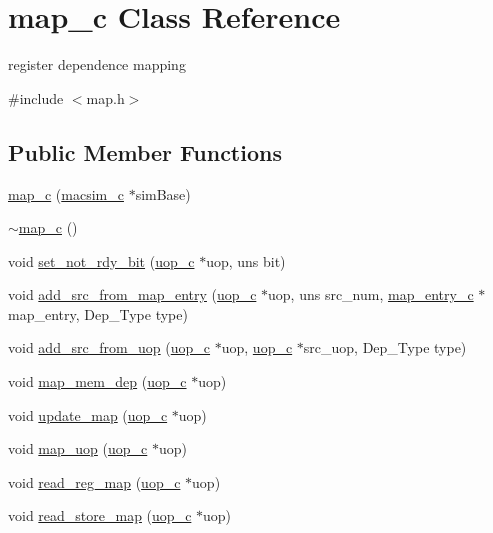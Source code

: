 \hypertarget{classmap__c}{
\section{map\_\-c Class Reference}
\label{classmap__c}
}


register dependence mapping  




{\ttfamily \#include $<$map.h$>$}

\subsection*{Public Member Functions}
\begin{DoxyCompactItemize}
\item 
\hyperlink{classmap__c_a5da8b3e64f7caac52a295a7e9b933f75}{map\_\-c} (\hyperlink{classmacsim__c}{macsim\_\-c} $\ast$simBase)
\item 
\hyperlink{classmap__c_a0ea194b2e9f7b55924fb542d78d8ca6f}{$\sim$map\_\-c} ()
\item 
void \hyperlink{classmap__c_a15ec904cf369a18d9b96954852783575}{set\_\-not\_\-rdy\_\-bit} (\hyperlink{classuop__c}{uop\_\-c} $\ast$uop, uns bit)
\item 
void \hyperlink{classmap__c_adbabb202c0a3811b5075b857f821f029}{add\_\-src\_\-from\_\-map\_\-entry} (\hyperlink{classuop__c}{uop\_\-c} $\ast$uop, uns src\_\-num, \hyperlink{classmap__entry__c}{map\_\-entry\_\-c} $\ast$map\_\-entry, Dep\_\-Type type)
\item 
void \hyperlink{classmap__c_aae742289893034f94a5618efde509f84}{add\_\-src\_\-from\_\-uop} (\hyperlink{classuop__c}{uop\_\-c} $\ast$uop, \hyperlink{classuop__c}{uop\_\-c} $\ast$src\_\-uop, Dep\_\-Type type)
\item 
void \hyperlink{classmap__c_a823103c7d95ab23d6b115bcb787768e7}{map\_\-mem\_\-dep} (\hyperlink{classuop__c}{uop\_\-c} $\ast$uop)
\item 
void \hyperlink{classmap__c_ab8b07395663470c39f25ed31fe93fd68}{update\_\-map} (\hyperlink{classuop__c}{uop\_\-c} $\ast$uop)
\item 
void \hyperlink{classmap__c_a7369eb469d7d7a3e88cd25e73db7d101}{map\_\-uop} (\hyperlink{classuop__c}{uop\_\-c} $\ast$uop)
\item 
void \hyperlink{classmap__c_ad1e67ca582adc46312128a69301b59f3}{read\_\-reg\_\-map} (\hyperlink{classuop__c}{uop\_\-c} $\ast$uop)
\item 
void \hyperlink{classmap__c_a007d7ff6b649658cb5b83e4abc87fd7f}{read\_\-store\_\-map} (\hyperlink{classuop__c}{uop\_\-c} $\ast$uop)

\end{DoxyCompactItemize}
